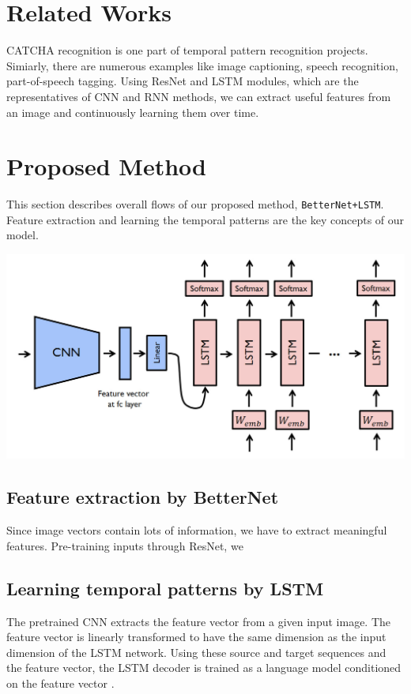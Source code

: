 \documentclass[10pt,letterpaper]{article}
\begin{document}
\section{Related Works}

CATCHA recognition is one part of temporal pattern recognition projects. Simiarly, there are numerous examples like image captioning, speech recognition, part-of-speech tagging. Using ResNet and LSTM modules, which are the representatives of CNN and RNN methods, we can extract useful features from an image and continuously learning them over time.

\section{Proposed Method}
This section describes overall flows of our proposed method, \texttt{BetterNet+LSTM}. Feature extraction and learning the temporal patterns are the key concepts of our model.

\begin{center}
\includegraphics[width=0.7\linewidth]{./model.jpg}
\end{center}

\subsection{Feature extraction by BetterNet}
Since image vectors contain lots of information, we have to extract meaningful features. Pre-training inputs through ResNet, we


\subsection{Learning temporal patterns by LSTM}
The pretrained CNN extracts the feature vector from a given input image. The feature vector is linearly transformed to have the same dimension as the input dimension of the LSTM network.
Using these source and target sequences and the feature vector, the LSTM decoder is trained as a language model conditioned on the feature vector \cite{image-captioning}.
\end{document}
